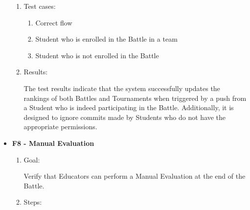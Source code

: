 \documentclass{Configuration_Files/Template}
\begin{document}
\begin{itemize}
\begin{enumerate}
        \item Test cases:
        
        \begin{enumerate}
        
            \item Correct flow
            \item Student who is enrolled in the Battle in a team
            \item Student who is not enrolled in the Battle
    
        \end{enumerate}
        
        \item Results:
        
        The test results indicate that the system successfully updates the rankings of both Battles and Tournaments when triggered by a push from a Student who is indeed participating in the Battle. Additionally, it is designed to ignore commits made by Students who do not have the appropriate permissions.\\
    
    \end{enumerate}

    \item \textbf{F8 - Manual Evaluation}
    
    \begin{enumerate}
    
        \item Goal:
        
        Verify that Educators can perform a Manual Evaluation at the end of the Battle.
        
        \item Steps:
        

\end{enumerate}
\end{itemize}
\end{document}
